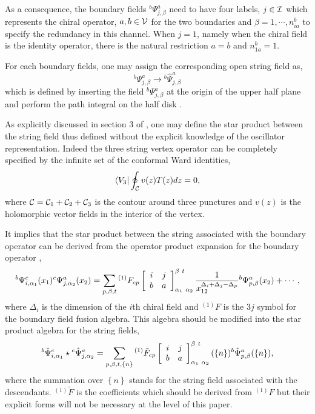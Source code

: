 \documentclass[a4paper,12pt]{article}
\begin{document}
As a consequence, the boundary fields 
${}^b\Psi^a_{j,\beta}$ need to have
four labels,  $j\in \cal I$ which represents the chiral
operator, $a,b\in\cal V$ for the two boundaries and 
$\beta=1,\cdots,n_{ia}^b$ to specify the redundancy in
this channel.  When $j=1$, namely when the chiral
field is the identity operator, there is the natural
restriction $a=b$ and $n_{1a}^b=1$.

For each boundary fields, one may assign the corresponding
open string field as,
\begin{equation}
 {}^b\Psi^a_{j,\beta}\rightarrow {}^b{\hat\Psi}^a_{j,\beta}
\end{equation}
which is defined by inserting the field ${}^b\Psi^a_{j,\beta}$
at the origin of the upper half plane 
and perform the path integral on the half disk
\cite{r-Witten}.

As explicitly discussed in section 3 of \cite{r-RZ}, one may define
the star product between the string field thus defined without
the explicit knowledge of the oscillator representation.
Indeed the three string vertex operator can be completely specified
by the infinite set of the conformal Ward identities,
\begin{equation}
 \langle V_3 | \oint_{\cal C}v(z) T(z)dz=0,
\end{equation}
where ${\cal C}={\cal C}_1+{\cal C}_2+{\cal C}_3$  is
the contour around three punctures and $v(z)$ is the 
holomorphic vector fields in the interior of the vertex.

It implies that the star product between the string associated with
the boundary operator can be derived from the operator product
expansion for the boundary operator \cite{r-BPPZ},
\begin{equation}\label{e-prod}
 {}^b\Psi^c_{i,\alpha_1}(x_1) {}^c\Psi^a_{j,\alpha_2}(x_2)
 =  \sum_{p,\beta, t} {}^{(1)}F_{cp}\left[
\begin{array}{c c}
 i&j\\ b & a
\end{array}\right]^{\beta\ t}_{\alpha_1\ \alpha_2}
\frac{1}{x_{12}^{\Delta_i+\Delta_j-\Delta_p}}
 {}^b\Psi^a_{p,\beta}(x_2)+\cdots,
\end{equation}
where $\Delta_i$ is the dimension of the $i$th chiral field
and ${}^{(1)}F$ is the $3j$ symbol for the boundary field
fusion algebra.
This algebra should be modified into the star product
algebra for the string fields,
\begin{equation}\label{e-star}
 {{}^{b}\hat\Psi^{c}_{i,\alpha_1}}\star {{}^{c}\hat\Psi^{a}_{j,\alpha_2}}
= \sum_{p,\beta,t,\left\{n\right\}} {}^{(1)}\tilde{F}_{cp}\left[
\begin{array}{c c}
 i&j\\ b & a
\end{array}\right]^{\beta\ t}_{\alpha_1\ \alpha_2}(\left\{n\right\})
{{}^{b}\hat\Psi^{a}_{p,\beta}}(\left\{n\right\}),
\end{equation}
where the summation over $\left\{n\right\}$ stands for the 
string field associated with the descendants. ${}^{(1)}\tilde{F}$ is
the coefficients which should be derived from ${}^{(1)}F$ 
but their explicit forms will not be necessary
at the level of this paper.
\end{document}
